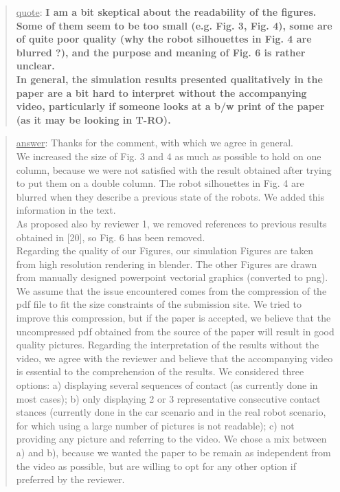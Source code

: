 \documentclass[a4paper]{article}
\newcommand{\done}[0]{}
\newcommand{\ndone}[0]{\textcolor{red}{TODO}}
\newcommand\quot[1]{\begin{quote} \underline{quote}: \textbf{#1}\end{quote}}
\newcommand\as[1]{\begin{quote} \underline{answer}: {#1}\end{quote} }
\begin{document}
\quot{I am a bit skeptical about the readability of the figures. Some of them seem to be too small (e.g. Fig. 3, Fig. 4), some are of quite poor quality (why the robot silhouettes in Fig. 4 are blurred ?), and the purpose and meaning of Fig. 6 is rather unclear. \\ In general, the simulation results presented qualitatively in the paper are a bit hard to interpret without the accompanying video, particularly if someone looks at a b/w print of the paper (as it may be looking in T-RO).}
\as{Thanks for the comment, with which we agree in general.  \\We increased the size of Fig. 3 and 4 as much as possible to hold on one column, because we were not satisfied with the result obtained after trying to put them on a double column. The robot silhouettes in Fig. 4 are blurred when they describe a previous state of the robots. We added this information in the text. \\ As proposed also by reviewer 1, we removed references to previous results obtained in [20], so Fig. 6 has been removed.
\\Regarding the quality of our Figures,  our simulation Figures are taken from high resolution rendering in blender. The other Figures are drawn from manually designed powerpoint vectorial graphics (converted to png). We assume that the issue encountered comes from the compression of the pdf file to fit the size constraints of the 
submission site. We tried to improve this compression, but if the paper is accepted, we believe that the uncompressed pdf obtained from the source of the paper will result in good quality pictures.
Regarding the interpretation of the results without the video, we agree with the reviewer and believe that the accompanying video is essential to the comprehension of the results. We considered three options: a) displaying several sequences of contact (as currently done in most cases); b) only displaying 2 or 3 representative consecutive contact stances (currently done
in the car scenario and in the real robot scenario, for which using a large number of pictures is not readable); c)
not providing any picture and referring to the video. We chose a mix between a) and b), because we wanted the paper to be remain as independent from the video as possible, but are willing to opt for any other option if preferred by the reviewer.}\done

\end{document}

